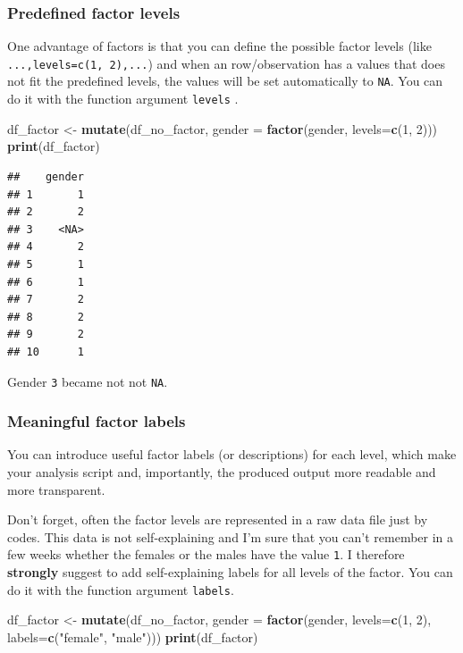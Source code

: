 \documentclass[
]{scrartcl}
\newenvironment{Shaded}{\begin{snugshade}}{\end{snugshade}}
\newcommand{\AttributeTok}[1]{\textcolor[rgb]{0.13,0.29,0.53}{#1}}
\newcommand{\DecValTok}[1]{\textcolor[rgb]{0.00,0.00,0.81}{#1}}
\newcommand{\FunctionTok}[1]{\textcolor[rgb]{0.13,0.29,0.53}{\textbf{#1}}}
\newcommand{\NormalTok}[1]{#1}
\newcommand{\OtherTok}[1]{\textcolor[rgb]{0.56,0.35,0.01}{#1}}
\newcommand{\StringTok}[1]{\textcolor[rgb]{0.31,0.60,0.02}{#1}}
\begin{document}
\subsubsection{Predefined factor levels}\label{predefined-factor-levels}

One advantage of factors is that you can define the possible factor levels (like \texttt{...,levels=c(1,\ 2),...}) and when an row/observation has a values that does not fit the predefined levels, the values will be set automatically to \texttt{NA}. You can do it with the function argument \texttt{levels} .

\begin{Shaded}
\begin{Highlighting}[]
\NormalTok{df\_factor }\OtherTok{\textless{}{-}}  \FunctionTok{mutate}\NormalTok{(df\_no\_factor,}
            \AttributeTok{gender =} \FunctionTok{factor}\NormalTok{(gender, }\AttributeTok{levels=}\FunctionTok{c}\NormalTok{(}\DecValTok{1}\NormalTok{, }\DecValTok{2}\NormalTok{)))}
\FunctionTok{print}\NormalTok{(df\_factor)}
\end{Highlighting}
\end{Shaded}

\begin{verbatim}
##    gender
## 1       1
## 2       2
## 3    <NA>
## 4       2
## 5       1
## 6       1
## 7       2
## 8       2
## 9       2
## 10      1
\end{verbatim}

Gender \texttt{3} became not not \texttt{NA}.

\subsubsection{Meaningful factor labels}\label{meaningful-factor-labels}

You can introduce useful factor labels (or descriptions) for each level, which make your analysis script and, importantly, the produced output more readable and more transparent.

Don't forget, often the factor levels are represented in a raw data file just by codes. This data is not self-explaining and I'm sure that you can't remember in a few weeks whether the females or the males have the value \texttt{1}. I therefore \textbf{strongly} suggest to add self-explaining labels for all levels of the factor. You can do it with the function argument \texttt{labels}.

\begin{Shaded}
\begin{Highlighting}[]
\NormalTok{df\_factor }\OtherTok{\textless{}{-}}  \FunctionTok{mutate}\NormalTok{(df\_no\_factor,}
            \AttributeTok{gender =} \FunctionTok{factor}\NormalTok{(gender, }\AttributeTok{levels=}\FunctionTok{c}\NormalTok{(}\DecValTok{1}\NormalTok{, }\DecValTok{2}\NormalTok{), }\AttributeTok{labels=}\FunctionTok{c}\NormalTok{(}\StringTok{"female"}\NormalTok{, }\StringTok{"male"}\NormalTok{)))}
\FunctionTok{print}\NormalTok{(df\_factor)}
\end{Highlighting}
\end{Shaded}
\end{document}
